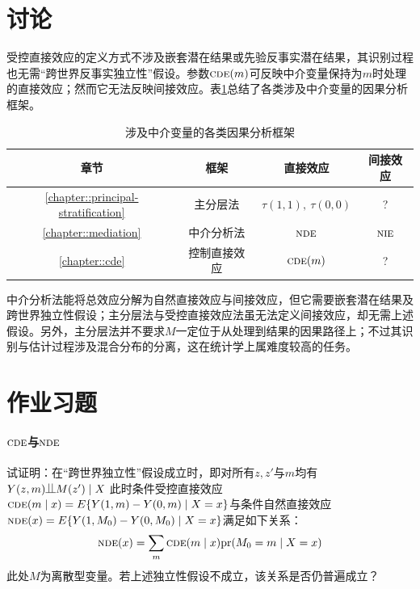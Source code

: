 \section{讨论}

受控直接效应的定义方式不涉及嵌套潜在结果或先验反事实潜在结果，其识别过程也无需“跨世界反事实独立性”假设。参数$\textsc{cde}(m)$可反映中介变量保持为$m$时处理的直接效应；然而它无法反映间接效应。表\ref{table::causal-intermediate-frameworks}总结了各类涉及中介变量的因果分析框架。
 
\begin{table}
\centering 
\caption{涉及中介变量的各类因果分析框架}\label{table::causal-intermediate-frameworks}
\begin{tabular}{cccc}
\hline 
章节 & 框架 & 直接效应 & 间接效应   \\
\hline 
\ref{chapter::principal-stratification} & 主分层法 & $\tau(1,1),\ \tau(0,0)$ & ?  \\
\ref{chapter::mediation} & 中介分析法 & $\textsc{nde}$ & $\textsc{nie}$  \\
\ref{chapter::cde}& 控制直接效应 & $\textsc{cde}(m)$ & ?  \\
\hline 
\end{tabular}
\end{table} 
 
中介分析法能将总效应分解为自然直接效应与间接效应，但它需要嵌套潜在结果及跨世界独立性假设；主分层法与受控直接效应法虽无法定义间接效应，却无需上述假设。另外，主分层法并不要求$M$一定位于从处理到结果的因果路径上；不过其识别与估计过程涉及混合分布的分离，这在统计学上属难度较高的任务。 



  
  \section{作业习题}

\paragraph{$\textsc{cde}$与$\textsc{nde}$}\label{problem::cde-nde}

试证明：在“跨世界独立性”假设成立时，即对所有$z,z'$与$m$均有
$
Y(z,m) \ind M(z') \mid X
$
此时条件受控直接效应$\textsc{cde}(m\mid x) = E\{  Y(1,m)  - Y(0,m)\mid X=x\}$与条件自然直接效应$\textsc{nde}(x) = E\{   Y(1,M_0) - Y(0, M_0) \mid X=x  \}$满足如下关系：
$$
\textsc{nde}(x) = \sum_m \textsc{cde}(m\mid x) \textup{pr}(M_0 = m\mid X=x)
$$
此处$M$为离散型变量。若上述独立性假设不成立，该关系是否仍普遍成立？ 
  
  
  
